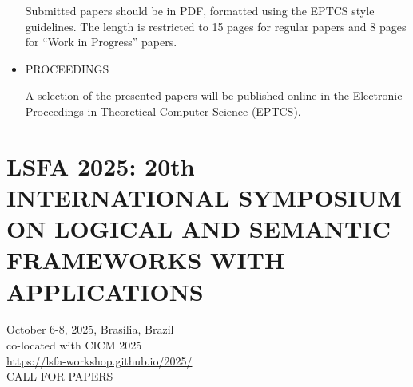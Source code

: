 \documentclass[prodmode,acmtecs]{acmsmall} %
\begin{document}
\begin{itemize}
  Submitted papers should be in PDF, formatted using the EPTCS style guidelines. The length is restricted to 15 pages for regular papers and 8 pages for ``Work in Progress'' papers.  
 
\item  PROCEEDINGS 
 
  A selection of the presented papers will be published online in the Electronic Proceedings in Theoretical Computer Science (EPTCS). 
 
\end{itemize}\section{LSFA 2025: 20th INTERNATIONAL SYMPOSIUM ON LOGICAL AND SEMANTIC FRAMEWORKS WITH APPLICATIONS}\label{LSFA2025}  October 6-8, 2025, Brasília, Brazil\\ 
  co-located with CICM 2025\\ 
  \href{https://lsfa-workshop.github.io/2025/}{https://lsfa-workshop.github.io/2025/}\\ 
CALL FOR PAPERS 
\end{document}
